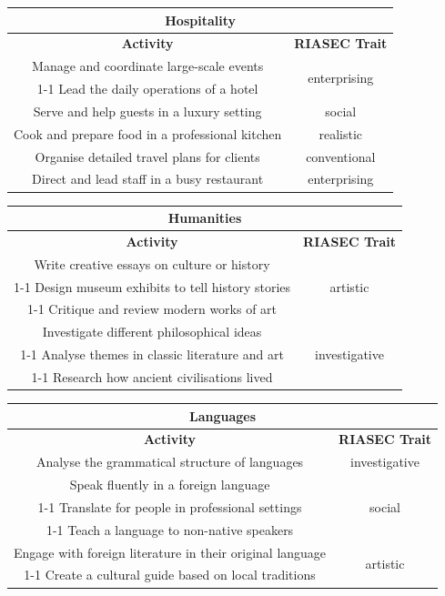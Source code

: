 \begin{table}[H]
\centering
\begin{tabular}{|c|c|}
\hline
\multicolumn{2}{|c|}{\textbf{Hospitality}}\\
\hline
\hline
\textbf{Activity} & \textbf{RIASEC Trait}\\
\hline
Manage and coordinate large-scale events & \multirow{2}{*}{enterprising}\\
\cline{1-1}
Lead the daily operations of a hotel & \\
\hline
Serve and help guests in a luxury setting & social\\
\hline
Cook and prepare food in a professional kitchen & realistic\\
\hline
Organise detailed travel plans for clients & conventional\\
\hline
Direct and lead staff in a busy restaurant & enterprising\\
\hline
\end{tabular}
\end{table}

\begin{table}[H]
\centering
\begin{tabular}{|c|c|}
\hline
\multicolumn{2}{|c|}{\textbf{Humanities}}\\
\hline
\hline
\textbf{Activity} & \textbf{RIASEC Trait}\\
\hline
Write creative essays on culture or history & \multirow{3}{*}{artistic}\\
\cline{1-1}
Design museum exhibits to tell history stories & \\
\cline{1-1}
Critique and review modern works of art & \\
\hline
Investigate different philosophical ideas & \multirow{3}{*}{investigative}\\
\cline{1-1}
Analyse themes in classic literature and art & \\
\cline{1-1}
Research how ancient civilisations lived & \\
\hline
\end{tabular}
\end{table}

\begin{table}[H]
\centering
\begin{tabular}{|c|c|}
\hline
\multicolumn{2}{|c|}{\textbf{Languages}}\\
\hline
\hline
\textbf{Activity} & \textbf{RIASEC Trait}\\
\hline
Analyse the grammatical structure of languages & investigative\\
\hline
Speak fluently in a foreign language & \multirow{3}{*}{social}\\
\cline{1-1}
Translate for people in professional settings &\\
\cline{1-1}
Teach a language to non-native speakers & \\
\hline
Engage with foreign literature in their original language & \multirow{2}{*}{artistic}\\
\cline{1-1}
Create a cultural guide based on local traditions & \\
\hline
\end{tabular}
\end{table}

